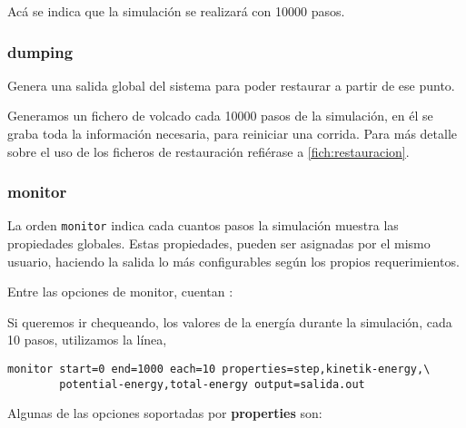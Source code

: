 
Ac\'a se indica que la simulaci\'on se realizar\'a con 10000 pasos.

\subsubsection{dumping}
Genera una salida global del sistema para poder restaurar a partir de ese punto.


Generamos un fichero de volcado cada 10000 pasos de la simulaci\'on, en \'el se
graba toda la informaci\'on necesaria, para reiniciar una corrida. Para m\'as
detalle sobre el uso de los ficheros de restauraci\'on refi\'erase a
\ref{fich:restauracion}.

\subsubsection{monitor}
La orden \verb|monitor| indica cada cuantos pasos la simulaci\'on muestra las
propiedades globales. Estas propiedades, pueden ser asignadas por el mismo
usuario, haciendo la salida lo m\'as configurables seg\'un los propios
requerimientos.

Entre las opciones de monitor, cuentan :


Si queremos ir chequeando, los valores de la energ\'ia durante la simulaci\'on,
cada 10 pasos, utilizamos la l\'inea,

\begin{verbatim}
monitor start=0 end=1000 each=10 properties=step,kinetik-energy,\
        potential-energy,total-energy output=salida.out
\end{verbatim}

Algunas de las opciones soportadas por \textbf{properties} son:

